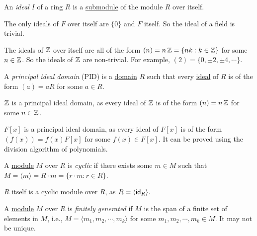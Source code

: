 \begin{definition}[Ideal]\label{def:ideal}
  An \emph{ideal} $I$ of a ring $R$ is a \hyperref[def:submodule]{submodule} of the module $R$ over itself.
\end{definition}

\begin{example}
  The only ideals of $F$ over itself are $\{ 0 \}$ and $F$ itself. So the ideal of a field is trivial.
\end{example}

\begin{example}
  The ideals of $\operatorname{\mathbb{Z}}$ over itself are all of the form $(n) = n\operatorname{\mathbb{Z}} = \{ nk : k \in \operatorname{\mathbb{Z}} \}$ for some $n \in \operatorname{\mathbb{Z}}$. So the ideals of $\operatorname{\mathbb{Z}}$ are non-trivial. For example, $(2) = \{ 0, \pm 2, \pm 4, \cdots \}$.
\end{example}

\begin{definition}\label{def:principal_ideal_domain}
  A \emph{principal ideal domain} (PID) is a \hyperref[def:domain]{domain} $R$ such that every \hyperref[def:ideal]{ideal} of $R$ is of the form $(a) = aR$ for some $a \in R$.
\end{definition}

\begin{example}
  $\operatorname{\mathbb{Z}}$ is a principal ideal domain, as every ideal of $\operatorname{\mathbb{Z}}$ is of the form $(n) = n\operatorname{\mathbb{Z}}$ for some $n \in \operatorname{\mathbb{Z}}$.
\end{example}

\begin{example}
  $F[x]$ is a principal ideal domain, as every ideal of $F[x]$ is of the form $(f(x)) = f(x) F[x]$ for some $f(x) \in F[x]$. It can be proved using the division algorithm of polynomials.
\end{example}

\begin{definition}\label{def:cyclic_module}
  A \hyperref[def:module]{module} $M$ over $R$ is \emph{cyclic} if there exists some $m \in M$ such that $M = \langle m \rangle = R \cdot m = \{ r \cdot m : r \in R \}$.
\end{definition}

\begin{example}
  $R$ itself is a cyclic module over $R$, as $R = \langle \operatorname{\text{\normalfont\sffamily id}}_R \rangle$.
\end{example}

\begin{definition}\label{def:finitely_generated_module}
  A \hyperref[def:module]{module} $M$ over $R$ is \emph{finitely generated} if $M$ is the span of a finite set of elements in $M$, i.e., $M = \langle m_1, m_2, \cdots, m_k \rangle$ for some $m_1, m_2, \cdots, m_k \in M$. It may not be unique.
\end{definition}

